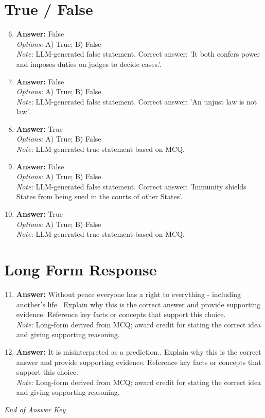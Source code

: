 \documentclass[12pt]{article}
\begin{document}
\section*{True / False}
\begin{enumerate}[label=\arabic*.]
\setcounter{enumi}{5}
\item \textbf{Answer:} False
\\ \textit{Options:} A) True; B) False
\\ \textit{Note:} LLM-generated false statement. Correct answer: 'It both confers power and imposes duties on judges to decide cases.'.
\item \textbf{Answer:} False
\\ \textit{Options:} A) True; B) False
\\ \textit{Note:} LLM-generated false statement. Correct answer: 'An unjust law is not law.'.
\item \textbf{Answer:} True
\\ \textit{Options:} A) True; B) False
\\ \textit{Note:} LLM-generated true statement based on MCQ.
\item \textbf{Answer:} False
\\ \textit{Options:} A) True; B) False
\\ \textit{Note:} LLM-generated false statement. Correct answer: 'Immunity shields States from being sued in the courts of other States'.
\item \textbf{Answer:} True
\\ \textit{Options:} A) True; B) False
\\ \textit{Note:} LLM-generated true statement based on MCQ.
\end{enumerate}

\section*{Long Form Response}
\begin{enumerate}[label=\arabic*.]
\setcounter{enumi}{10}
\item \textbf{Answer:} Without peace everyone has a right to everything - including another's life.. Explain why this is the correct answer and provide supporting evidence. Reference key facts or concepts that support this choice.
\\ \textit{Note:} Long-form derived from MCQ; award credit for stating the correct idea and giving supporting reasoning.
\item \textbf{Answer:} It is misinterpreted as a prediction.. Explain why this is the correct answer and provide supporting evidence. Reference key facts or concepts that support this choice.
\\ \textit{Note:} Long-form derived from MCQ; award credit for stating the correct idea and giving supporting reasoning.
\end{enumerate}

\vfill
\noindent\textit{End of Answer Key}
\end{document}
